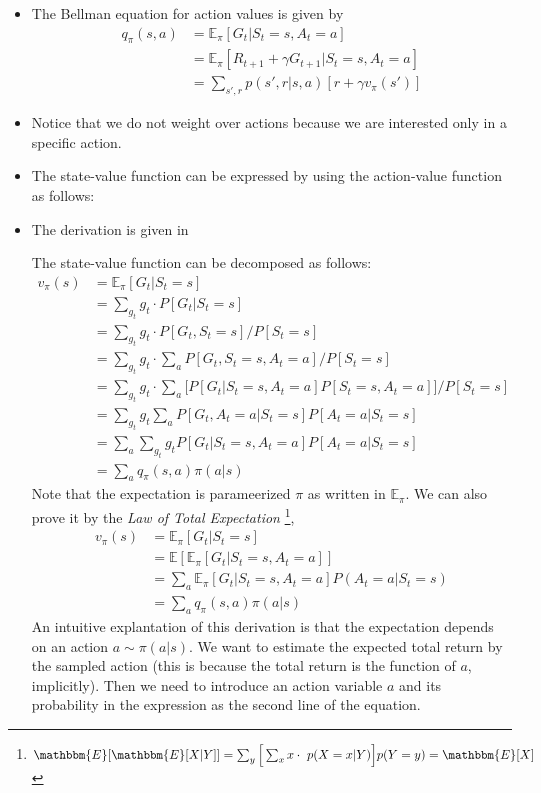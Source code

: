 \begin{itemize}
	\item The Bellman equation for action values is given by
	\begin{align*}
		q_{\pi}(s,a) &= \mathbb{E}_\pi[G_t|S_t=s, A_t=a]\\
		& = \mathbb{E}_\pi[R_{t+1} + \gamma G_{t+1}|S_t=s, A_t=a]\\
		& = \sum_{s',r}p(s',r|s,a)[r + \gamma v_\pi(s')]
	\end{align*}
	\item Notice that we do not weight over actions because we are interested only in a specific action.
	\item The state-value function can be expressed by using the action-value function as follows:
	\item The derivation is given in 

The state-value function can be decomposed as follows:
\begin{align*}
	v_\pi(s) &= \mathbb{E}_{\pi}[G_t|S_t = s]\\ 
	&= \sum_{g_t} g_t\cdot P[G_t|S_t=s]\\
	&= \sum_{g_t} g_t\cdot P[G_t,S_t=s]/P[S_t=s]\\
	&= \sum_{g_t} g_t\cdot \sum_a P[G_t,S_t=s, A_t=a]/P[S_t=s]\\
	&= \sum_{g_t} g_t\cdot \sum_a \Big[P[G_t|S_t=s, A_t=a]P[S_t=s, A_t=a]\Big]/P[S_t=s]\\
	&= \sum_{g_t} g_t \sum_a P[G_t, A_t=a|S_t=s] P[A_t=a|S_t=s]\\
	&= \sum_{a} \sum_{g_t} g_t P[G_t|S_t=s, A_t=a] P[A_t=a|S_t=s]\\
	&= \sum_{a} q_\pi(s,a) \pi(a|s)
\end{align*}
Note that the expectation is parameerized $\pi$ as written in $\mathbb{E}_{\pi}$. We can also prove it by the \textit{Law of Total Expectation} \footnote{
$\mathbbm{E}[\mathbbm{E}[X|Y]] = \sum_{y}\Big[\sum_{x}x\cdot\ p(X=x|Y)\Big] p(Y=y) = \mathbbm{E}[X]$},
\begin{align*}
	v_\pi(s) &= \mathbb{E}_{\pi}[G_t|S_t = s]\\ 
	&= \mathbb{E}[\mathbb{E}_{\pi}[G_t|S_t=s, A_t=a]]\\
	&= \sum_{a} \mathbb{E}_{\pi}[G_t|S_t=s, A_t=a] P(A_t = a|S_t = s)\\
	&= \sum_{a} q_\pi(s,a) \pi(a|s)
\end{align*}
An intuitive explantation of this derivation is that the expectation depends on an action $a\sim \pi(a|s)$. We want to estimate the expected total return by the sampled action (this is because the total return is the function of $a$, implicitly). Then we need to introduce an action variable $a$ and its probability in the expression as the second line of the equation. 
\end{itemize}

